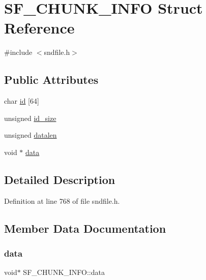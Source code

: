 \hypertarget{struct_s_f___c_h_u_n_k___i_n_f_o}{}\section{S\+F\+\_\+\+C\+H\+U\+N\+K\+\_\+\+I\+N\+FO Struct Reference}
\label{struct_s_f___c_h_u_n_k___i_n_f_o}


{\ttfamily \#include $<$sndfile.\+h$>$}

\subsection*{Public Attributes}
\begin{DoxyCompactItemize}
\item 
char \mbox{\hyperlink{struct_s_f___c_h_u_n_k___i_n_f_o_afedf0986b689c3962843160d15acdad6}{id}} \mbox{[}64\mbox{]}
\item 
unsigned \mbox{\hyperlink{struct_s_f___c_h_u_n_k___i_n_f_o_afa2490bdb8ac85fc207ef938a8c4a03d}{id\+\_\+size}}
\item 
unsigned \mbox{\hyperlink{struct_s_f___c_h_u_n_k___i_n_f_o_a82ed11e618cd236142f6b57435ebd279}{datalen}}
\item 
void $\ast$ \mbox{\hyperlink{struct_s_f___c_h_u_n_k___i_n_f_o_a9bd4fdc49c651ebc889c15567c9477f7}{data}}
\end{DoxyCompactItemize}


\subsection{Detailed Description}


Definition at line 768 of file sndfile.\+h.



\subsection{Member Data Documentation}
\mbox{\label{struct_s_f___c_h_u_n_k___i_n_f_o_a9bd4fdc49c651ebc889c15567c9477f7}} 
\subsubsection{\texorpdfstring{data}{data}}
{\footnotesize\ttfamily void$\ast$ S\+F\+\_\+\+C\+H\+U\+N\+K\+\_\+\+I\+N\+F\+O\+::data}



